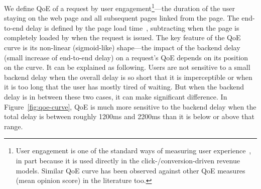 We define QoE of a request by user engagement\footnote{User engagement is one of the standard ways of measuring user experience~\cite{balachandran2014modeling,shafiq2014understanding,dobrian2011understanding}, in part because it is used directly in the click-/conversion-driven revenue models. Similar QoE curve has been observed against other QoE measures (\eg mean opinion score) in the literature too.}---the duration of the user staying on the web page and all subsequent pages linked from the page. 
The end-to-end delay is defined by the page load time~\cite{wang2013demystify}, \ie subtracting when the page is completely loaded by when the request is issued.
The key feature of the QoE curve is its non-linear (sigmoid-like) shape---\ie the impact of the backend delay (\ie small increase of end-to-end delay) on a request's QoE depends on its position on the curve.
It can be explained as following.
Users are not sensitive to a small backend delay when the overall delay is so short that it is imperceptible or when it is too long that the user has mostly tired of waiting. But when the backend delay is in between these two cases, it can make significant difference. 
In Figure~\ref{fig:qoe-curve}, QoE is much more sensitive to the backend delay when the total delay is between roughly 1200ms and 2200ms than it is below or above that range.


